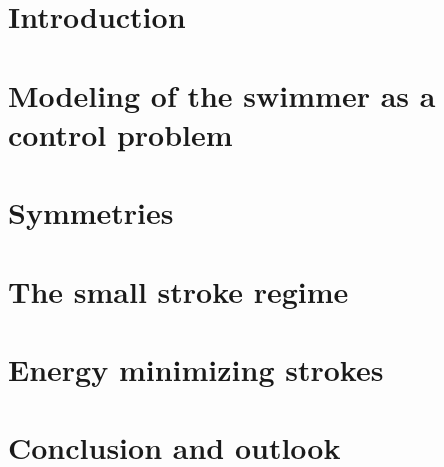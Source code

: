 \documentclass[10pt,a4paper]{article}
\numberwithin{equation}{section}
\theoremstyle{plain}
\theoremstyle{plain}
\theoremstyle{plain}
\theoremstyle{remark}
\theoremstyle{definition}
\theoremstyle{definition}
\theoremstyle{plain}
\theoremstyle{plain}
\begin{document}
\section{Introduction}


\section[Modeling]{Modeling of the swimmer as a control problem}


\section{Symmetries}


\section[The small strokes regime]{The small stroke regime}


\section{Energy minimizing strokes}


\section{Conclusion and outlook}



\printbibliography[title = Bibliography]
\end{document}

